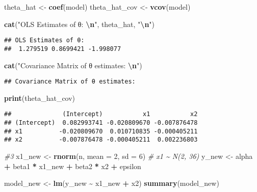 \documentclass[
]{article}
\newenvironment{Shaded}{\begin{snugshade}}{\end{snugshade}}
\newcommand{\AttributeTok}[1]{\textcolor[rgb]{0.13,0.29,0.53}{#1}}
\newcommand{\CommentTok}[1]{\textcolor[rgb]{0.56,0.35,0.01}{\textit{#1}}}
\newcommand{\DecValTok}[1]{\textcolor[rgb]{0.00,0.00,0.81}{#1}}
\newcommand{\FunctionTok}[1]{\textcolor[rgb]{0.13,0.29,0.53}{\textbf{#1}}}
\newcommand{\NormalTok}[1]{#1}
\newcommand{\OtherTok}[1]{\textcolor[rgb]{0.56,0.35,0.01}{#1}}
\newcommand{\SpecialCharTok}[1]{\textcolor[rgb]{0.81,0.36,0.00}{\textbf{#1}}}
\newcommand{\StringTok}[1]{\textcolor[rgb]{0.31,0.60,0.02}{#1}}
\begin{document}
\begin{Shaded}
\begin{Highlighting}[]
\NormalTok{theta\_hat }\OtherTok{\textless{}{-}} \FunctionTok{coef}\NormalTok{(model)}
\NormalTok{theta\_hat\_cov }\OtherTok{\textless{}{-}} \FunctionTok{vcov}\NormalTok{(model)  }

\FunctionTok{cat}\NormalTok{(}\StringTok{"OLS Estimates of θ: }\SpecialCharTok{\textbackslash{}n}\StringTok{"}\NormalTok{, theta\_hat, }\StringTok{"}\SpecialCharTok{\textbackslash{}n}\StringTok{"}\NormalTok{)}
\end{Highlighting}
\end{Shaded}

\begin{verbatim}
## OLS Estimates of θ: 
##  1.279519 0.8699421 -1.998077
\end{verbatim}

\begin{Shaded}
\begin{Highlighting}[]
\FunctionTok{cat}\NormalTok{(}\StringTok{"Covariance Matrix of θ estimates: }\SpecialCharTok{\textbackslash{}n}\StringTok{"}\NormalTok{)}
\end{Highlighting}
\end{Shaded}

\begin{verbatim}
## Covariance Matrix of θ estimates:
\end{verbatim}

\begin{Shaded}
\begin{Highlighting}[]
\FunctionTok{print}\NormalTok{(theta\_hat\_cov)}
\end{Highlighting}
\end{Shaded}

\begin{verbatim}
##              (Intercept)           x1           x2
## (Intercept)  0.082993741 -0.020809670 -0.007876478
## x1          -0.020809670  0.010710835 -0.000405211
## x2          -0.007876478 -0.000405211  0.002236803
\end{verbatim}

\begin{Shaded}
\begin{Highlighting}[]
\CommentTok{\#3}
\NormalTok{x1\_new }\OtherTok{\textless{}{-}} \FunctionTok{rnorm}\NormalTok{(n, }\AttributeTok{mean =} \DecValTok{2}\NormalTok{, }\AttributeTok{sd =} \DecValTok{6}\NormalTok{)        }\CommentTok{\# x1 \textasciitilde{} N(2, 36)}
\NormalTok{y\_new }\OtherTok{\textless{}{-}}\NormalTok{ alpha }\SpecialCharTok{+}\NormalTok{ beta1 }\SpecialCharTok{*}\NormalTok{ x1\_new }\SpecialCharTok{+}\NormalTok{ beta2 }\SpecialCharTok{*}\NormalTok{ x2 }\SpecialCharTok{+}\NormalTok{ epsilon}

\NormalTok{model\_new }\OtherTok{\textless{}{-}} \FunctionTok{lm}\NormalTok{(y\_new }\SpecialCharTok{\textasciitilde{}}\NormalTok{ x1\_new }\SpecialCharTok{+}\NormalTok{ x2)}
\FunctionTok{summary}\NormalTok{(model\_new)}
\end{Highlighting}
\end{Shaded}
\end{document}
